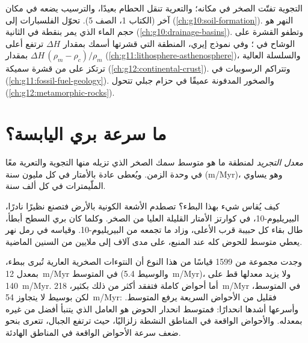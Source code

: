 \begin{recall}
التجوية تفتّت الصخر في مكانه؛ والتعرية تنقل الحطام بعيدًا،
والترسيب يضعه في مكان آخر (الكتاب 1، الصف 5). 
تحوّل الفلسبارات إلى  
(\cref{ch:g10:soil-formation}).  النهر هو حجم
الماء الذي يمر بنقطة في الثانية (\cref{ch:g10:drainage-basins}). وتطفو
القشرة على الوشاح في ؛ وفي نموذج إيري، المنطقة التي قشرتها
أسمك بمقدار $\Delta H$ ترتفع أعلى بمقدار $\Delta H\,(\rho_m - \rho_c)/\rho_m$
(\cref{ch:g11:lithosphere-asthenosphere})، والسلسلة العالية ترتكز على 
من قشرة سميكة (\cref{ch:g12:continental-crust}). وتتراكم الرسوبيات في
 (\cref{ch:g11:fossil-fuel-geology}). والصخور المدفونة عميقًا في
حزام جبلي تتحول (\cref{ch:g12:metamorphic-rocks}).
\end{recall}

\section{ما سرعة بري اليابسة؟}

\begin{definition}\label{def:g12:destruction-of-mountains:denudation}
\emph{معدل التجريد} لمنطقة ما هو متوسط
سمك الصخر الذي تزيله منها التجوية والتعرية معًا في
وحدة الزمن. ويُعطى عادة بالأمتار في كل مليون سنة
(\unit{m/Myr})، وهو يساوي الملّيمترات في كل ألف سنة.
\end{definition}

كيف يُقاس شيء بهذا البطء؟ تصطدم الأشعة الكونية بالأرض فتصنع
نظيرًا نادرًا، البيريليوم-10، في كوارتز الأمتار القليلة العليا من الصخر.
وكلما كان بري السطح أبطأ، طال بقاء كل حبيبة قرب الأعلى،
وزاد ما تجمعه من البيريليوم-10. وقياسه في رمل نهر
يعطي متوسط  للحوض كله عند المنبع، على مدى
آلاف إلى ملايين من السنين الماضية.

وجدت مجموعة من 1599 قياسًا من هذا النوع أن النتوءات الصخرية العارية
تُبرى ببطء، بمعدل \qty{12}{m/Myr} في المتوسط (والوسيط
\qty{5.4}{m/Myr})، ولا يزيد معدلها قط على \qty{140}{m/Myr}. أما أحواض
 كاملة فتفقد أكثر من ذلك بكثير، \qty{218}{m/Myr} في المتوسط، لكن بوسيط
لا يتجاوز \qty{54}{m/Myr}: فقليل من الأحواض السريعة يرفع المتوسط. وأسرعها
أشدها انحدارًا: فمتوسط انحدار الحوض هو العامل الذي يتنبأ أفضل من غيره
بمعدله. والأحواض الواقعة في المناطق النشطة زلزاليًا، حيث ترتفع الجبال،
تتعرى بنحو ضعف سرعة الأحواض الواقعة في المناطق الهادئة.


